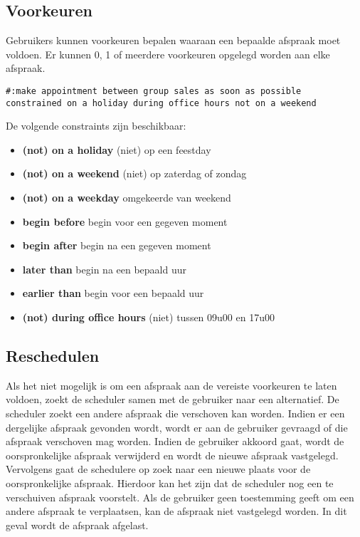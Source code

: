 \documentclass[a4paper]{article}
\begin{document}
\subsection{Voorkeuren}
Gebruikers kunnen voorkeuren bepalen waaraan een bepaalde afspraak moet voldoen.
Er kunnen 0, 1 of meerdere voorkeuren opgelegd worden aan elke afspraak.

\begin{verbatim}
#:make appointment between group sales as soon as possible 
constrained on a holiday during office hours not on a weekend
\end{verbatim}

De volgende constraints zijn beschikbaar:
\begin{itemize}
\item {\bf (not) on a holiday} (niet) op een feestday
\item {\bf (not) on a weekend} (niet) op zaterdag of zondag 
\item {\bf (not) on a weekday} omgekeerde van weekend
\item {\bf begin before} begin voor een gegeven moment
\item {\bf begin after} begin na een gegeven moment
\item {\bf later than} begin na een bepaald uur
\item {\bf earlier than} begin voor een bepaald uur
\item {\bf (not) during office hours} (niet) tussen 09u00 en 17u00
\end{itemize}

\subsection{Reschedulen}
Als het niet mogelijk is om een afspraak aan de vereiste voorkeuren te laten voldoen, zoekt de scheduler samen met de gebruiker naar een alternatief.
De scheduler zoekt een andere afspraak die verschoven kan worden.
Indien er een dergelijke afspraak gevonden wordt, wordt er aan de gebruiker gevraagd of die afspraak verschoven mag worden.
Indien de gebruiker akkoord gaat, wordt de oorspronkelijke afspraak verwijderd en wordt de nieuwe afspraak vastgelegd.
Vervolgens gaat de schedulere op zoek naar een nieuwe plaats voor de oorspronkelijke afspraak.
Hierdoor kan het zijn dat de scheduler nog een te verschuiven afspraak voorstelt.
Als de gebruiker geen toestemming geeft om een andere afspraak te verplaatsen, kan de afspraak niet vastgelegd worden.
In dit geval wordt de afspraak afgelast.
\end{document}
